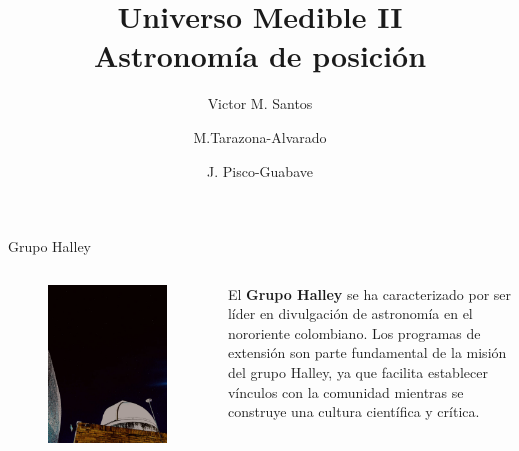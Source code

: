 \documentclass{beamer}
\title[Universo Medible II] 
{Universo Medible II \\ Astronomía de posición}
\author[Victor M. Santos] 
{Victor M. Santos \inst{} \and M.Tarazona-Alvarado \inst{} \and J. Pisco-Guabave \inst{}} %
\institute[]{
\inst{}Grupo Halley, Escuela de Física, Universidad Industrial de Santander, Bucaramanga, Colombia.}
\date{ }
\begin{document}


\begin{frame}{Grupo Halley}
\titlepage %
\end{frame}


\begin{frame}
 \begin{columns}
  \begin{figure}
   \centering
   \includegraphics[scale=0.15]{Imagenes/Halley}
  \end{figure}
 \small
 \justify
  El \textbf{Grupo Halley} se ha caracterizado por ser líder en divulgación de astronomía en el nororiente colombiano. Los programas de extensión son parte fundamental de la misión del grupo Halley, ya que facilita establecer vínculos con la comunidad mientras se construye una cultura científica y crítica.
 \end{columns}
\end{frame}
\end{document}
